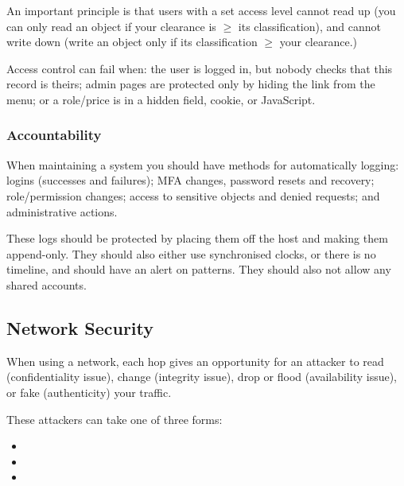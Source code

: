 \noindent An important principle is that users with a set access level cannot read up (you can only read an object if your clearance is \(\geq\) its classification), and cannot write down (write an object only if its classification \(\geq\) your clearance.)

Access control can fail when: the user is logged in, but nobody checks that this record is theirs;
admin pages are protected only by hiding the link from the menu;
or a role/price is in a hidden field, cookie, or JavaScript.

\subsubsection{Accountability}

When maintaining a system you should have methods for automatically logging: logins (successes and failures); MFA changes, password resets and recovery; role/permission changes; access to sensitive objects and denied requests; and administrative actions.

These logs should be protected by placing them off the host and making them append-only. 
They should also either use synchronised clocks, or there is no timeline, and should have an alert on patterns. 
They should also not allow any shared accounts.

\subsection{Network Security}

When using a network, each hop gives an opportunity for an attacker to read (confidentiality issue), change (integrity issue), drop or flood (availability issue), or fake (authenticity) your traffic.

These attackers can take one of three forms:
\begin{itemize}
    \item {}
    \item {}
    \item {}
\end{itemize}

